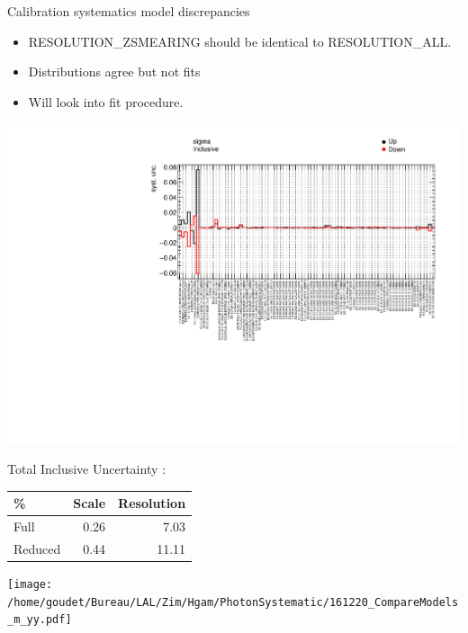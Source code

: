 \documentclass[a4paper]{beamer}
\begin{document}
\begin{frame}{Calibration systematics model discrepancies}
  \begin{minipage}{0.49\linewidth}
    \begin{itemize}
    \item RESOLUTION\_ZSMEARING should be identical to RESOLUTION\_ALL.
    \item Distributions agree but not fits
    \item Will look into fit procedure.
    \end{itemize}
  \end{minipage}
  \hfill
  \begin{minipage}{0.49\linewidth}
    \includegraphics[width=\linewidth]{plots/allSyst_sigma_Inclusive_sigma.pdf}\\
  \end{minipage}
  \begin{minipage}{0.49\linewidth}
    \begin{center}
      Total Inclusive Uncertainty :
      \begin{tabular}{l|rr}
        \% & Scale & Resolution \\
        \hline
        Full & 0.26 & 7.03 \\
        Reduced & 0.44 & 11.11 \\
      \end{tabular}
    \end{center}
  \end{minipage}
  \hfill
  \begin{minipage}{0.49\linewidth}
    \texttt{[image: /home/goudet/Bureau/LAL/Zim/Hgam/PhotonSystematic/161220\_CompareModels\_m\_yy.pdf]}
  \end{minipage}
\end{frame}
\end{document}
